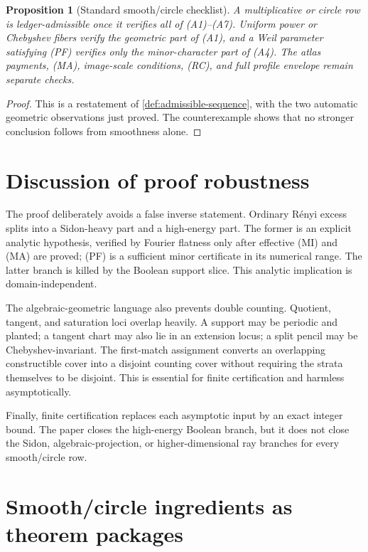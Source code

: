 \documentclass[12pt,a4paper]{amsart}
\numberwithin{equation}{section}
\newtheorem{proposition}[proposition]{Proposition}
\theoremstyle{remark}
\newcommand{\Renyi}{R\'enyi}
\begin{document}
\begin{proposition}[Standard smooth/circle checklist]\label{prop:standard-admissible}
A multiplicative or circle row is ledger-admissible once it verifies all of
\textup{(A1)}--\textup{(A7)}.  Uniform power or Chebyshev fibers verify the
geometric part of \textup{(A1)}, and a Weil parameter satisfying
\textup{(PF)} verifies only the minor-character part of \textup{(A4)}.
The atlas payments, \textup{(MA)}, image-scale conditions,
\textup{(RC)}, and full profile envelope remain separate checks.
\end{proposition}

\begin{proof}
This is a restatement of \cref{def:admissible-sequence}, with the two
automatic geometric observations just proved.  The counterexample shows
that no stronger conclusion follows from smoothness alone.
\end{proof}

\section{Discussion of proof robustness}\label{sec:robustness}

The proof deliberately avoids a false inverse statement.  Ordinary
\Renyi{} excess splits into a Sidon-heavy part and a high-energy part.  The
former is an explicit analytic hypothesis, verified by Fourier flatness
only after effective \textup{(MI)} and \textup{(MA)} are proved;
\textup{(PF)} is a sufficient minor certificate in its numerical range.
The latter branch is killed by the Boolean support slice.  This analytic
implication is domain-independent.

The algebraic-geometric language also prevents double counting.  Quotient, tangent, and saturation loci overlap heavily.  A support may be periodic and planted; a tangent chart may also lie in an extension locus; a split pencil may be Chebyshev-invariant.  The first-match assignment converts an overlapping constructible cover into a disjoint counting cover without requiring the strata themselves to be disjoint.  This is essential for finite certification and harmless asymptotically.

Finally, finite certification replaces each asymptotic input by an exact
integer bound.  The paper closes the high-energy Boolean branch, but it
does not close the Sidon, algebraic-projection, or higher-dimensional ray
branches for every smooth/circle row.


\section{Smooth/circle ingredients as theorem packages}\label{sec:ingredient-packages}
\end{document}
